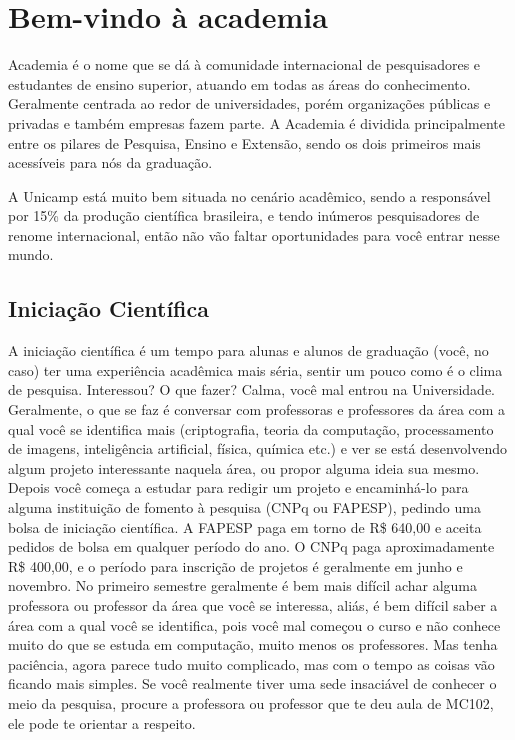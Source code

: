 
\section{Bem-vindo à academia}

Academia é o nome que se dá à comunidade internacional de pesquisadores e
estudantes de ensino superior, atuando em todas as áreas do conhecimento.
Geralmente centrada ao redor de universidades, porém organizações públicas e
privadas e também empresas fazem parte. A Academia é dividida principalmente
entre os pilares de Pesquisa, Ensino e Extensão, sendo os dois primeiros mais
acessíveis para nós da graduação.

A Unicamp está muito bem situada no cenário acadêmico, sendo a responsável por
15\% da produção científica brasileira, e tendo inúmeros pesquisadores de
renome internacional, então não vão faltar oportunidades para você entrar nesse
mundo.

\subsection{Iniciação Científica}

A iniciação científica é um tempo para alunas e alunos de graduação (você, no
caso) ter uma experiência acadêmica mais séria, sentir um pouco como é o clima
de pesquisa. Interessou? O que fazer? Calma, você mal entrou na Universidade.
Geralmente, o que se faz é conversar com professoras e professores da área com
a qual você se identifica mais (criptografia, teoria da computação,
processamento de imagens, inteligência artificial, física, química etc.) e ver
se está desenvolvendo algum projeto interessante naquela área, ou propor alguma
ideia sua mesmo. Depois você começa a estudar para redigir um projeto e
encaminhá-lo para alguma instituição de fomento à pesquisa (CNPq ou FAPESP),
pedindo uma bolsa de iniciação científica. A FAPESP paga em torno de R\$ 640,00
e aceita pedidos de bolsa em qualquer período do ano. O CNPq paga
aproximadamente R\$ 400,00, e o período para inscrição de projetos é geralmente
em junho e novembro. No primeiro semestre geralmente é bem mais difícil achar
alguma professora ou professor da área que você se interessa, aliás, é bem
difícil saber a área com a qual você se identifica, pois você mal começou o
curso e não conhece muito do que se estuda em computação, muito menos os
professores. Mas tenha paciência, agora parece tudo muito complicado, mas com o
tempo as coisas vão ficando mais simples. Se você realmente tiver uma sede
insaciável de conhecer o meio da pesquisa, procure a professora ou professor
que te deu aula de MC102, ele pode te orientar a respeito.


